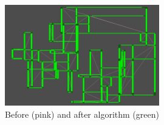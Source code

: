 \documentclass{article}
\begin{document}
\begin{figure}
\centering
\includegraphics[width = 0.6\textwidth]{coridoors and edges}
\caption{Before (pink) and after algorithm (green)}
\label{ba coridoors and edges}
\end{figure}

\newpage
\printbibliography
\end{document}
